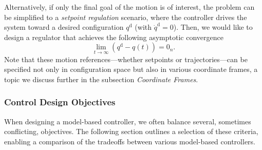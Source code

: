 Alternatively, if only the final goal of the motion is of interest, the problem can be simplified to a \emph{setpoint regulation} scenario, where the controller drives the system toward a desired configuration $q^\mathrm{d}$ (with $\dot{q}^\mathrm{d} = 0$).
Then, we would like to design a regulator that achieves the following asymptotic convergence
\begin{equation}
    \lim_{t \to \infty} \left ( q^\mathrm{d} - q(t) \right ) = 0_n.
\end{equation}
Note that these motion references—whether setpoints or trajectories—can be specified not only in configuration space but also in various coordinate frames, a topic we discuss further in the subsection \emph{Coordinate Frames}.

\subsubsection{Control Design Objectives}
When designing a model-based controller, we often balance several, sometimes conflicting, objectives. The following section outlines a selection of these criteria, enabling a comparison of the tradeoffs between various model-based controllers.

